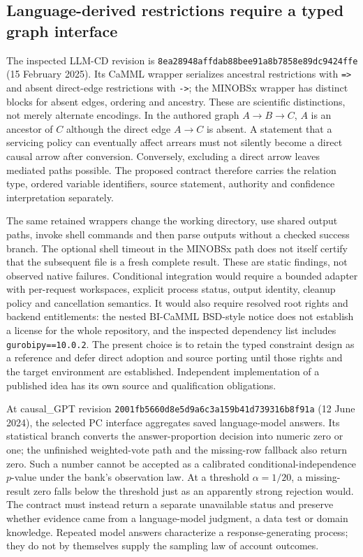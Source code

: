 \subsection{Language-derived restrictions require a typed graph interface}
The inspected LLM-CD revision is
\texttt{8ea28948affdab88bee91}\allowbreak\texttt{a8b7858e89dc9424ffe}
(15 February 2025). Its CaMML wrapper serializes ancestral restrictions with
\texttt{=>} and absent direct-edge restrictions with \texttt{->}; the MINOBSx
wrapper has distinct blocks for absent edges, ordering and ancestry. These are
scientific distinctions, not merely alternate encodings. In the authored graph
$A\to B\to C$, $A$ is an ancestor of $C$ although the direct edge $A\to C$ is
absent. A statement that a servicing policy can eventually affect arrears must
not silently become a direct causal arrow after conversion. Conversely,
excluding a direct arrow leaves mediated paths possible. The proposed contract
therefore carries the relation type, ordered variable identifiers, source
statement, authority and confidence interpretation separately.~\citep{exec14_iid_cd,exec25_agents_choice}

The same retained wrappers change the working directory, use shared output
paths, invoke shell commands and then parse outputs without a checked success
branch. The optional shell timeout in the MINOBSx path does not itself certify
that the subsequent file is a fresh complete result. These are static findings,
not observed native failures. Conditional integration would require a bounded
adapter with per-request workspaces, explicit process status, output identity,
cleanup policy and cancellation semantics. It would also require resolved root
rights and backend entitlements: the nested BI-CaMML BSD-style notice does not
establish a license for the whole repository, and the inspected dependency list
includes \texttt{gurobipy==10.0.2}. The present choice is to retain the typed
constraint design as a reference and defer direct adoption and source porting
until those rights and the target environment are established. Independent
implementation of a published idea has its own source and qualification
obligations.~\citep{exec14_iid_cd,exec25_agents_choice}

At causal\_GPT revision
\texttt{2001fb5660d8e5d9a6c3}\allowbreak\texttt{a159b41d739316b8f91a}
(12 June 2024), the selected PC interface aggregates saved language-model
answers. Its statistical branch converts the answer-proportion decision into
numeric zero or one; the unfinished weighted-vote path and the missing-row
fallback also return zero. Such a number cannot be accepted as a calibrated
conditional-independence $p$-value under the bank's observation law. At a
threshold $\alpha=1/20$, a missing-result zero falls below the threshold just as
an apparently strong rejection would. The contract must instead return a
separate unavailable status and preserve whether evidence came from a
language-model judgment, a data test or domain knowledge. Repeated model
answers characterize a response-generating process; they do not by themselves
supply the sampling law of account outcomes.~\citep{exec14_iid_gpt,exec25_agents_choice}

